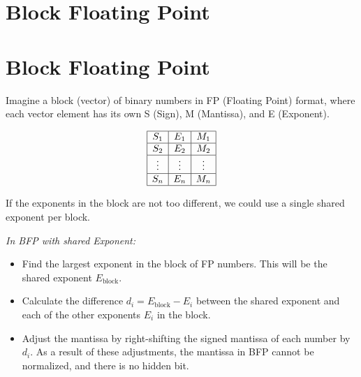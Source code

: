 \documentclass[12pt,openany, tikz,border=10pt]{book}
\begin{document}
  \section{Block Floating Point}
  \section*{Block Floating Point}

Imagine a block (vector) of binary numbers in FP (Floating Point) format, where each vector element has its own S (Sign), M (Mantissa), and E (Exponent).

\[
\begin{array}{|c|c|c|}
\hline
S_1 & E_1 & M_1 \\
\hline
S_2 & E_2 & M_2 \\
\hline
\vdots & \vdots & \vdots \\
\hline
S_n & E_n & M_n \\
\hline
\end{array}
\]

If the exponents in the block are not too different, we could use a single shared exponent per block.

    

\textit{In BFP with shared Exponent:}
\begin{itemize}
    \item[] Find the largest exponent in the block of FP numbers. This will be the shared exponent \( E_{\text{block}} \).
    \item[] Calculate the difference \( d_i = E_{\text{block}} - E_i \) between the shared exponent and each of the other exponents \( E_i \) in the block.
    \item[] Adjust the mantissa by right-shifting the signed mantissa of each number by \( d_i \). As a result of these adjustments, the mantissa in BFP cannot be normalized, and there is no hidden bit.
\end{itemize}
\end{document}
